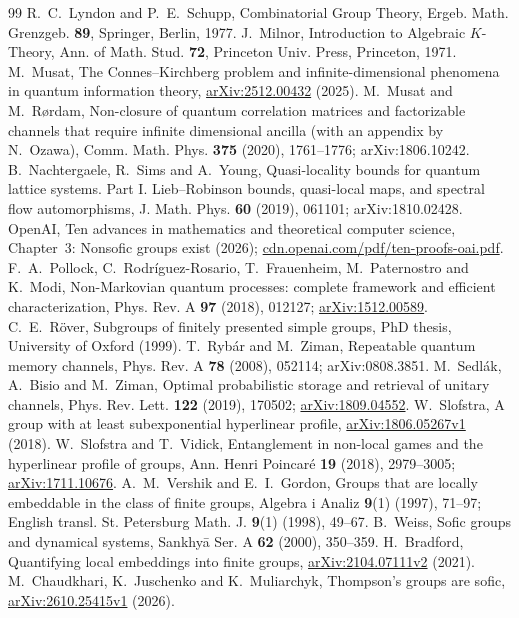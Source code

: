 \begin{thebibliography}{99}
 R.~C.~Lyndon and P.~E.~Schupp, Combinatorial Group Theory, Ergeb. Math. Grenzgeb. \textbf{89}, Springer, Berlin, 1977.
 J.~Milnor, Introduction to Algebraic $K$-Theory, Ann. of Math. Stud. \textbf{72}, Princeton Univ. Press, Princeton, 1971.
 M.~Musat, The Connes--Kirchberg problem and infinite-dimensional phenomena in quantum information theory, \href{https://arxiv.org/abs/2512.00432}{arXiv:2512.00432} (2025).
 M.~Musat and M.~R{\o}rdam, Non-closure of quantum correlation matrices and factorizable channels that require infinite dimensional ancilla (with an appendix by N.~Ozawa), Comm. Math. Phys. \textbf{375} (2020), 1761--1776; arXiv:1806.10242.
 B.~Nachtergaele, R.~Sims and A.~Young, Quasi-locality bounds for quantum lattice systems. Part I. Lieb--Robinson bounds, quasi-local maps, and spectral flow automorphisms, J. Math. Phys. \textbf{60} (2019), 061101; arXiv:1810.02428.
 OpenAI, Ten advances in mathematics and theoretical computer science, Chapter~3: Nonsofic groups exist (2026); \href{https://cdn.openai.com/pdf/ten-proofs-oai.pdf}{cdn.openai.com/pdf/ten-proofs-oai.pdf}.
 F.~A.~Pollock, C.~Rodr\'iguez-Rosario, T.~Frauenheim, M.~Paternostro and K.~Modi, Non-Markovian quantum processes: complete framework and efficient characterization, Phys. Rev. A \textbf{97} (2018), 012127; \href{https://arxiv.org/abs/1512.00589}{arXiv:1512.00589}.
 C.~E.~R\"over, Subgroups of finitely presented simple groups, PhD thesis, University of Oxford (1999).
 T.~Ryb\'ar and M.~Ziman, Repeatable quantum memory channels, Phys. Rev. A \textbf{78} (2008), 052114; arXiv:0808.3851.
 M.~Sedl\'ak, A.~Bisio and M.~Ziman, Optimal probabilistic storage and retrieval of unitary channels, Phys. Rev. Lett. \textbf{122} (2019), 170502; \href{https://arxiv.org/abs/1809.04552}{arXiv:1809.04552}.
 W.~Slofstra, A group with at least subexponential hyperlinear profile, \href{https://arxiv.org/abs/1806.05267v1}{arXiv:1806.05267v1} (2018).
 W.~Slofstra and T.~Vidick, Entanglement in non-local games and the hyperlinear profile of groups, Ann. Henri Poincar\'e \textbf{19} (2018), 2979--3005; \href{https://arxiv.org/abs/1711.10676}{arXiv:1711.10676}.
 A.~M.~Vershik and E.~I.~Gordon, Groups that are locally embeddable in the class of finite groups, Algebra i Analiz \textbf{9}(1) (1997), 71--97; English transl. St. Petersburg Math. J. \textbf{9}(1) (1998), 49--67.
 B.~Weiss, Sofic groups and dynamical systems, Sankhy\=a Ser. A \textbf{62} (2000), 350--359.
 H.~Bradford, Quantifying local embeddings into finite groups, \href{https://arxiv.org/abs/2104.07111v2}{arXiv:2104.07111v2} (2021).
 M.~Chaudkhari, K.~Juschenko and K.~Muliarchyk,
Thompson's groups are sofic,
\href{https://arxiv.org/abs/2610.25415v1}{arXiv:2610.25415v1} (2026).
\end{thebibliography}
